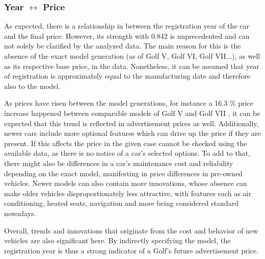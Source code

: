 \subsubsection{Year $\leftrightarrow$ Price} \label{year_to_price_correlation}
As expected, there is a relationship in between the registration year of the car and the final price.
However, its strength with 0.842 is unprecedented and can not solely be clarified by the analyzed data. 
The main reason for this is the absence of the exact model generation (as of Golf V, Golf VI, Golf VII...), as well as its respective base price, in the data.
Nonetheless, it can be assumed that year of registration is approximately equal to the manufacturing date and therefore also to the model. 
\par
As prices have risen between the model generations, for instance a 16.3 \% price increase happened between comparable models of Golf V and Golf VII \autocite{DuelVWGolf},
it can be expected that this trend is reflected in advertisement prices as well. 
Additionally, newer cars include more optional features which can drive up the price if they are present.
If this affects the price in the given case cannot be checked using the available data,
as there is no notice of a car's selected options. 
\newline
To add to that, there might also be differences in a car's maintenance cost and reliability depending on the exact model, manifesting in price differences in pre-owned vehicles.
Newer models can also contain more innovations, whose absence can make older vehicles  disproportionately less attractive, with features such as air conditioning, heated seats,
navigation and more being considered standard nowadays.
\par
Overall, trends and innovations that originate from the cost and behavior of new vehicles are also significant here.
By indirectly specifying the model, the registration year is thus a strong indicator of a Golf's future advertisement price.
